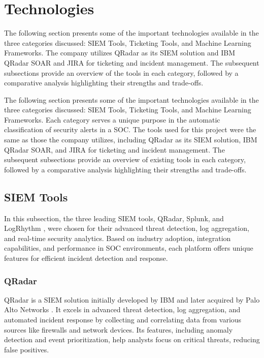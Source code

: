 \section{Technologies}


The following section presents some of the important technologies available in the three categories discussed: SIEM Tools, Ticketing Tools, and Machine Learning Frameworks. 
The company utilizes QRadar as its SIEM solution and IBM QRadar SOAR and JIRA for ticketing and incident management. The subsequent subsections provide an overview of the tools in each category, followed by a comparative analysis highlighting their strengths and trade-offs.


The following section presents some of the important technologies available in the three categories discussed: SIEM Tools, Ticketing Tools, and Machine Learning Frameworks. 
Each category serves a unique purpose in the automatic classification of security alerts in a SOC.
The tools used for this project were the same as those the company utilizes, including QRadar as its SIEM solution, IBM QRadar SOAR, and JIRA for ticketing and incident management.
The subsequent subsections provide an overview of existing tools in each category, followed by a comparative analysis highlighting their strengths and trade-offs.

\subsection{SIEM Tools}

In this subsection, the three leading SIEM tools, QRadar, Splunk, and LogRhythm \parencite{exabeam2024}, were chosen for their advanced threat detection, log aggregation, and real-time security analytics. 
Based on industry adoption, integration capabilities, and performance in SOC environments, each platform offers unique features for efficient incident detection and response.

\subsubsection{QRadar}
QRadar is a SIEM solution initially developed by IBM and later acquired by Palo Alto Networks \parencite{paloalto2024}. 
It excels in advanced threat detection, log aggregation, and automated incident response by collecting and correlating data from various sources like firewalls and network devices. Its features, including anomaly detection and event prioritization, help analysts focus on critical threats, reducing false positives.

